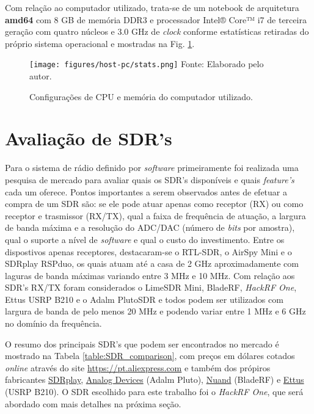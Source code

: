 \documentclass[
  12pt,				%
  openright,			%
  twoside,			%
  a4paper,			%
  english,			%
  french,				%
  spanish,			%
  brazil,				%
  ]{abntex2}
\begin{document}
Com relação ao computador utilizado, trata-se de um notebook de arquitetura \textbf{amd64} com 8 GB de memória DDR3 e processador Intel® Core™ i7 de terceira geração com quatro núcleos e
3.0 GHz de \textit{clock} conforme estatísticas retiradas do próprio sistema operacional e mostradas na Fig. \ref{fig:host_pc_stats}.

\begin{figure}[!htb]
  \centering
  \caption{Configurações de CPU e memória do computador utilizado.}
  \texttt{[image: figures/host-pc/stats.png]}
  Fonte: Elaborado pelo autor.
  \label{fig:host_pc_stats}
\end{figure}

\section*{Avaliação de SDR's}

Para o sistema de rádio definido por \textit{software} primeiramente foi realizada uma pesquisa de mercado para avaliar quais os SDR's disponíveis e quais
\textit{feature's} cada um oferece. Pontos importantes a serem observados antes de efetuar a compra de um SDR são: se ele pode atuar apenas como receptor
(RX) ou como receptor e trasmissor (RX/TX), qual a faixa de frequência de atuação, a largura de banda máxima e a resolução do ADC/DAC (número de \textit{bits} por amostra),
qual o suporte a nível de \textit{software} e qual o custo do investimento. Entre os dispostivos apenas receptores, destacaram-se o RTL-SDR, o AirSpy Mini e o SDRplay RSPduo,
os quais atuam até a casa de 2 GHz aproximadamente com laguras de banda máximas variando entre 3 MHz e 10 MHz. Com relação aos SDR's RX/TX foram considerados
o LimeSDR Mini, BladeRF, \textit{HackRF One}, Ettus USRP B210 e o Adalm PlutoSDR e todos podem ser utilizados com largura de banda de pelo menos 20 MHz e podendo variar
entre 1 MHz e 6 GHz no domínio da frequência.

O resumo dos principais SDR's que podem ser encontrados no mercado é mostrado na Tabela \ref{table:SDR_comparison}, com preços em dólares cotados \textit{online} através do site \href{https://pt.aliexpress.com}{https://pt.aliexpress.com}
e também dos própiros fabricantes \href{https://www.sdrplay.com/rspduo/}{SDRplay}, \href{https://www.analog.com/en/design-center/evaluation-hardware-and-software/evaluation-boards-kits/adalm-pluto.html}{Analog Devices} (Adalm Pluto),
\href{https://www.nuand.com/bladerf-1/}{Nuand} (BladeRF) e \href{https://www.ettus.com/all-products/ub210-kit/}{Ettus} (USRP B210). O SDR escolhido para este trabalho foi o \textit{HackRF One}, que será abordado com mais detalhes na próxima seção.
\end{document}
